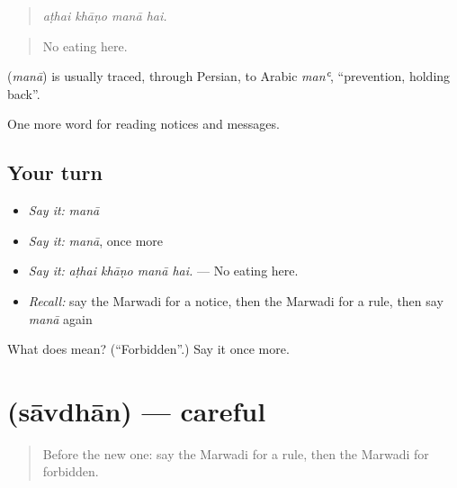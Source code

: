 \begin{quote}
   
\end{quote}

\begin{quote}
\emph{aṭhai khāṇo manā hai.}
\end{quote}

\begin{quote}
No eating here.
\end{quote}

\begin{cousinweb}
\textbf{} (\emph{manā}) is usually traced, through Persian, to Arabic \emph{manʿ}, \textquotedblleft{}prevention, holding back\textquotedblright{}.
\end{cousinweb}

\begin{grammarlens}[title={What you've built}]
One more word for reading notices and messages.
\end{grammarlens}

\subsection*{Your turn}
\begin{itemize}
\raggedright
  \item \emph{Say it:} \emph{manā}
  \item \emph{Say it:} \emph{manā}, once more
  \item \emph{Say it:} \emph{aṭhai khāṇo manā hai.} — No eating here.
  \item \emph{Recall:} say the Marwadi for a notice, then the Marwadi for a rule, then say \emph{manā} again
\end{itemize}

\begin{tcolorbox}[breakable,colback=teal!4,colframe=teal!35!black,title={Before you move on}]
What does  mean? (\textquotedblleft{}Forbidden\textquotedblright{}.) Say it once more.
\end{tcolorbox}
\section[\texorpdfstring{\mw{सावधान} (sāvdhān)}{सावधान (sāvdhān)}]{ (sāvdhān) — careful}

\label{lesson:MW-C191-savdhan}



\begin{quote}
Before the new one: say the Marwadi for a rule, then the Marwadi for forbidden.
\end{quote}

